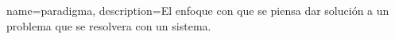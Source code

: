 {
	name=paradigma,
	description={El enfoque con que se piensa dar solución a un problema que se resolvera con un sistema.}
}